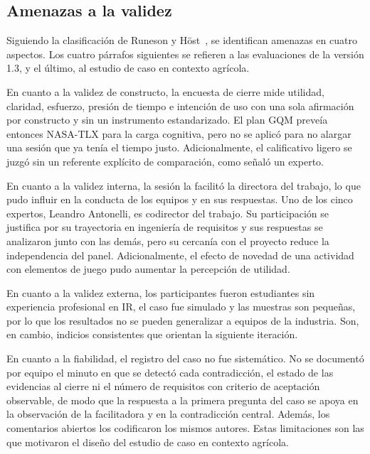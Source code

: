 \documentclass[12pt,letterpaper,oneside]{report}
\begin{document}
\subsection{Amenazas a la validez}
\label{sec:amenazas_eval}
Siguiendo la clasificación de Runeson y Höst~\cite{runeson2009case}, se
identifican amenazas en cuatro aspectos. Los cuatro párrafos siguientes se
refieren a las evaluaciones de la versión 1.3, y el último, al estudio de caso
en contexto agrícola.

En cuanto a la validez de constructo, la encuesta de cierre mide utilidad,
claridad, esfuerzo, presión de tiempo e intención de uso con una sola afirmación
por constructo y sin un instrumento estandarizado. El plan GQM preveía entonces
NASA-TLX para la carga cognitiva, pero no se aplicó para no alargar una sesión
que ya tenía el tiempo justo. Adicionalmente, el
calificativo ligero se juzgó sin un referente explícito de comparación, como
señaló un experto.

En cuanto a la validez interna, la sesión la facilitó la directora del trabajo, lo que pudo influir en la conducta de los
equipos y en sus respuestas. Uno de los cinco expertos, Leandro Antonelli, es
codirector del trabajo. Su participación se justifica por su trayectoria en
ingeniería de requisitos y sus respuestas se analizaron junto con las demás,
pero su cercanía con el proyecto reduce la independencia del panel.
Adicionalmente, el efecto de novedad de una actividad con elementos de juego
pudo aumentar la percepción de utilidad.

En cuanto a la validez externa, los participantes fueron estudiantes sin
experiencia profesional en IR, el caso fue simulado y las muestras son
pequeñas, por lo que los resultados no se pueden generalizar a equipos de la
industria. Son, en cambio, indicios consistentes que orientan la siguiente
iteración.

En cuanto a la fiabilidad, el registro del caso no fue sistemático. No se
documentó por equipo el minuto en que se detectó cada contradicción, el estado
de las evidencias al cierre ni el número de requisitos con criterio de aceptación observable,
de modo que la respuesta a la primera pregunta del caso se apoya en la
observación de la facilitadora y en la contradicción central. Además, los
comentarios abiertos los codificaron los mismos autores. Estas limitaciones
son las que motivaron el diseño del estudio de caso en contexto agrícola.
\end{document}
